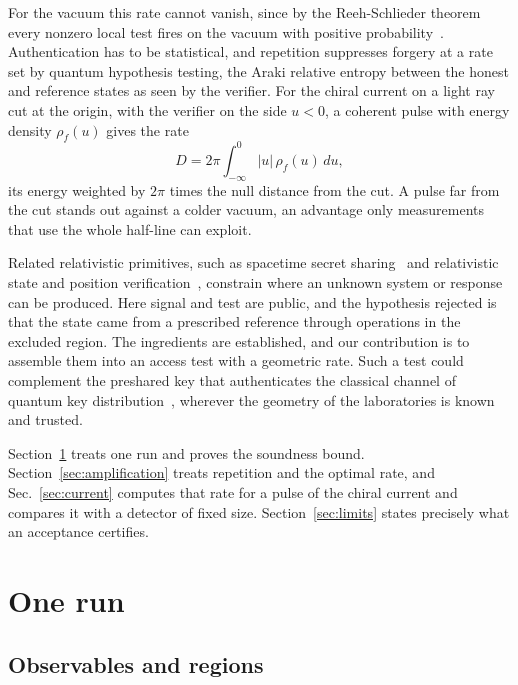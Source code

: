 \documentclass[11pt,a4paper]{article}
\begin{document}
For the vacuum this rate cannot vanish, since by the Reeh-Schlieder theorem every nonzero local test fires on the vacuum with positive probability~\cite{reeh1961bemerkungen,witten2018aps}. Authentication has to be statistical, and repetition suppresses forgery at a rate set by quantum hypothesis testing, the Araki relative entropy between the honest and reference states as seen by the verifier. For the chiral current on a light ray cut at the origin, with the verifier on the side $u<0$, a coherent pulse with energy density $\rho_f(u)$ gives the rate
\begin{equation*}
 D=2\pi\int_{-\infty}^0|u|\,\rho_f(u)\,du ,
\end{equation*}
its energy weighted by $2\pi$ times the null distance from the cut. A pulse far from the cut stands out against a colder vacuum, an advantage only measurements that use the whole half-line can exploit.

Related relativistic primitives, such as spacetime secret sharing~\cite{hayden2019localizing} and relativistic state and position verification~\cite{kent2014secure,kent2011quantum,chandran2009position,buhrman2014position}, constrain where an unknown system or response can be produced. Here signal and test are public, and the hypothesis rejected is that the state came from a prescribed reference through operations in the excluded region. The ingredients are established, and our contribution is to assemble them into an access test with a geometric rate. Such a test could complement the preshared key that authenticates the classical channel of quantum key distribution~\cite{bennett1984quantum}, wherever the geometry of the laboratories is known and trusted.

Section~\ref{sec:primitive} treats one run and proves the soundness bound. Section~\ref{sec:amplification} treats repetition and the optimal rate, and Sec.~\ref{sec:current} computes that rate for a pulse of the chiral current and compares it with a detector of fixed size. Section~\ref{sec:limits} states precisely what an acceptance certifies.

\section{One run}
\label{sec:primitive}

\subsection{Observables and regions}
\end{document}
